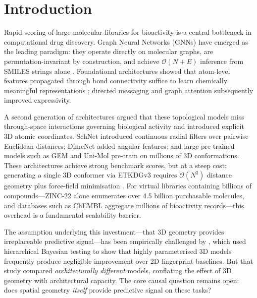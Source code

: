 \documentclass[pdflatex,sn-vancouver-num]{sn-jnl}%
\theoremstyle{thmstyleone}%
\theoremstyle{thmstyletwo}%
\theoremstyle{thmstylethree}%
\begin{document}



\maketitle

\section{Introduction}
\label{sec:intro}

Rapid scoring of large molecular libraries for bioactivity is a central
bottleneck in computational drug discovery.  Graph Neural Networks (GNNs)
have emerged as the leading paradigm: they operate directly on molecular
graphs, are permutation-invariant by construction, and achieve
$\mathcal{O}(N{+}E)$ inference from SMILES strings alone
\cite{zhang2025,kipf2017gcn,gilmer2017mpnn}.  Foundational architectures showed that
atom-level features propagated through bond connectivity suffice to learn
chemically meaningful representations \cite{duvenaud2015fingerprints};
directed messaging \cite{yang2019dmpnn} and graph attention subsequently improved expressivity.

A second generation of architectures argued that these topological models
miss through-space interactions governing biological activity and introduced
explicit 3D atomic coordinates.  SchNet \cite{schutt2018schnet} introduced
continuous radial filters over pairwise Euclidean distances; DimeNet
\cite{klicpera2020dimenet} added angular features; and large pre-trained
models such as GEM \cite{fang2022gem} and Uni-Mol \cite{zhou2023unimol}
pre-train on millions of 3D conformations.  These architectures achieve
strong benchmark scores, but at a steep cost: generating a single 3D
conformer via ETKDGv3 \cite{riniker2015etkdg} requires $\mathcal{O}(N^3)$
\cite{Wang2026} distance geometry plus force-field minimisation
\cite{tosco2014mmff}.  For virtual libraries containing billions of
compounds---ZINC-22 alone enumerates over 4.5 billion purchasable molecules, and databases such as ChEMBL \cite{gaulton2012chembl} aggregate millions of bioactivity records---this overhead
is a fundamental scalability barrier.

The assumption underlying this investment---that 3D geometry provides
irreplaceable predictive signal---has been empirically challenged by
\cite{praski2025benchmarking}, which used hierarchical Bayesian testing to
show that highly parameterised 3D models frequently produce negligible
improvement over 2D fingerprint baselines.  But that study compared
\emph{architecturally different} models, conflating the effect of 3D
geometry with architectural capacity.  The core causal question remains
open: does spatial geometry \emph{itself} provide predictive signal on
these tasks?
\end{document}
